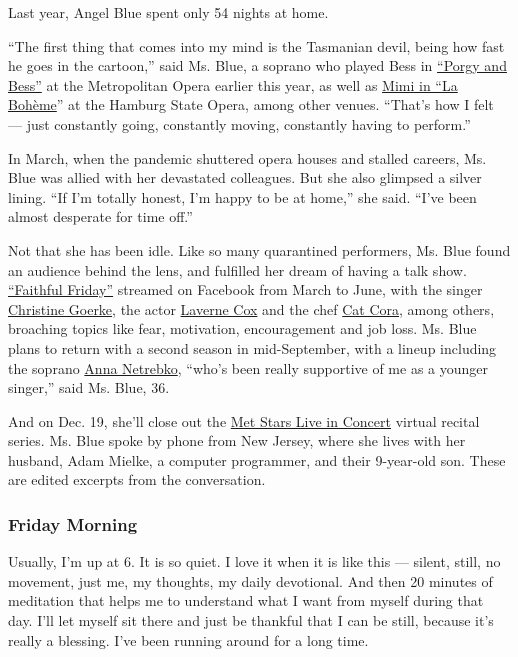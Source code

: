 Last year, Angel Blue spent only 54 nights at home.

``The first thing that comes into my mind is the Tasmanian devil, being
how fast he goes in the cartoon,'' said Ms. Blue, a soprano who played
Bess in
\href{https://www.nytimes3xbfgragh.onion/2019/09/24/arts/music/porgy-bess-met-opera-review.html}{``Porgy
and Bess''} at the Metropolitan Opera earlier this year, as well as
\href{https://www.operabase.com/artists/angel-blue-1128/en}{Mimi in ``La
Bohème}'' at the Hamburg State Opera, among other venues. ``That's how I
felt --- just constantly going, constantly moving, constantly having to
perform.''

In March, when the pandemic shuttered opera houses and stalled careers,
Ms. Blue was allied with her devastated colleagues. But she also
glimpsed a silver lining. ``If I'm totally honest, I'm happy to be at
home,'' she said. ``I've been almost desperate for time off.''

Not that she has been idle. Like so many quarantined performers, Ms.
Blue found an audience behind the lens, and fulfilled her dream of
having a talk show.
\href{https://www.facebookcorewwwi.onion/angeljoyblue/}{``Faithful
Friday''} streamed on Facebook from March to June, with the singer
\href{https://www.christinegoerke.com/}{Christine Goerke}, the actor
\href{https://lavernecox.com/}{Laverne Cox} and the chef
\href{https://catcora.com/}{Cat Cora}, among others, broaching topics
like fear, motivation, encouragement and job loss. Ms. Blue plans to
return with a second season in mid-September, with a lineup including
the soprano \href{https://annanetrebko.com/}{Anna Netrebko}, ``who's
been really supportive of me as a younger singer,'' said Ms. Blue, 36.

And on Dec. 19, she'll close out the
\href{https://metstarslive.brightcove-services.com/}{Met Stars Live in
Concert} virtual recital series. Ms. Blue spoke by phone from New
Jersey, where she lives with her husband, Adam Mielke, a computer
programmer, and their 9-year-old son. These are edited excerpts from the
conversation.

\hypertarget{friday-morning}{%
\subsubsection{\texorpdfstring{\textbf{Friday
Morning}}{Friday Morning}}\label{friday-morning}}

Usually, I'm up at 6. It is so quiet. I love it when it is like this ---
silent, still, no movement, just me, my thoughts, my daily devotional.
And then 20 minutes of meditation that helps me to understand what I
want from myself during that day. I'll let myself sit there and just be
thankful that I can be still, because it's really a blessing. I've been
running around for a long time.

